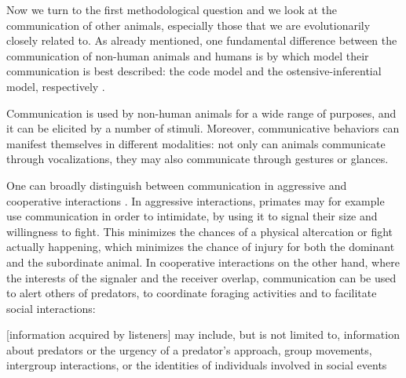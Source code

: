 
Now we turn to the first methodological question and we look at the communication of other animals, especially those that we are evolutionarily closely related to.
As already mentioned, one fundamental difference between the communication of non-human animals and humans is by which model their communication is best described: the code model and the ostensive-inferential model, respectively \citep{Scott-Phillips15-primate, Scott-Phillips18-communication}.

Communication is used by non-human animals for a wide range of purposes, and it can be elicited by a number of stimuli. Moreover, communicative behaviors can manifest themselves in different modalities: not only can animals communicate through vocalizations, they may also communicate through gestures or glances.

One can broadly distinguish between communication in aggressive and cooperative interactions \citep{SeyfarthCheney03}. In aggressive interactions, primates may for example use communication in order to intimidate, by using it to signal their size and willingness to fight. This minimizes the chances of a physical altercation or fight actually happening, which minimizes the chance of injury for both the dominant and the subordinate animal.
In cooperative interactions on the other hand, where the interests of the signaler and the receiver overlap, communication can be used to alert others of predators, to coordinate foraging activities and to facilitate social interactions:
\begin{quoting}
    {[information acquired by listeners]} may include, but is not limited to, information about predators or the urgency of a predator’s approach, group movements, intergroup interactions, or the identities of individuals involved in social events
    \hfill \citep[p.~168]{SeyfarthCheney03}
\end{quoting}

